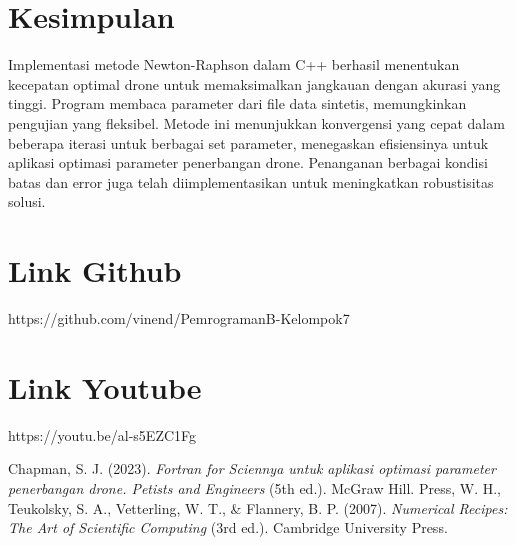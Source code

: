 \documentclass[conference]{IEEEtran}
\begin{document}
\section{Kesimpulan}
Implementasi metode Newton-Raphson dalam C++ berhasil menentukan kecepatan optimal drone untuk memaksimalkan jangkauan dengan akurasi yang tinggi. Program membaca parameter dari file data sintetis, memungkinkan pengujian yang fleksibel. Metode ini menunjukkan konvergensi yang cepat dalam beberapa iterasi untuk berbagai set parameter, menegaskan efisiensinya untuk aplikasi optimasi parameter penerbangan drone. Penanganan berbagai kondisi batas dan error juga telah diimplementasikan untuk meningkatkan robustisitas solusi.

\section*{Link Github}
https://github.com/vinend/PemrogramanB-Kelompok7

\section*{Link Youtube}
https://youtu.be/al-s5EZC1Fg

\begin{thebibliography}{00}
 Chapman, S. J. (2023). \textit{Fortran for Sciennya untuk aplikasi optimasi parameter penerbangan drone. Petists and Engineers} (5th ed.). McGraw Hill.
 Press, W. H., Teukolsky, S. A., Vetterling, W. T., \& Flannery, B. P. (2007). \textit{Numerical Recipes: The Art of Scientific Computing} (3rd ed.). Cambridge University Press.
\end{thebibliography}
\end{document}
